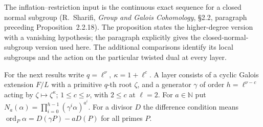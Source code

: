 The inflation--restriction input is the continuous exact sequence for
a closed normal subgroup (R.~Sharifi, \emph{Group and Galois Cohomology},
\S2.2, paragraph preceding Proposition~2.2.18). The proposition states the higher-degree version with a vanishing hypothesis; the paragraph explicitly gives the closed-normal-subgroup version used here. The additional comparisons identify its local subgroups and
the action on the particular twisted dual at every layer.
\cite{r21-sharifi}

For the next results write \(q=\ell^\nu,\ \kappa=1+\ell^c\).
A layer consists of a cyclic Galois extension \(F/L\) with a primitive
\(q\)-th root \(\zeta\), and a generator \(\gamma\) of order
\(h=\ell^{\nu-c}\) acting by \(\zeta\mapsto\zeta^\kappa\);
\(1\le c\le\nu\), with \(2\le c\) at \(\ell=2\). For \(a\in\mathbb N\)
put \(N_a(\alpha)=\prod_{i=0}^{h-1}(\gamma^i\alpha)^{a^i}\).
For a divisor \(D\) the difference condition means
\(\operatorname{ord}_P\alpha=D(\gamma P)-aD(P)\) for all primes \(P\).
